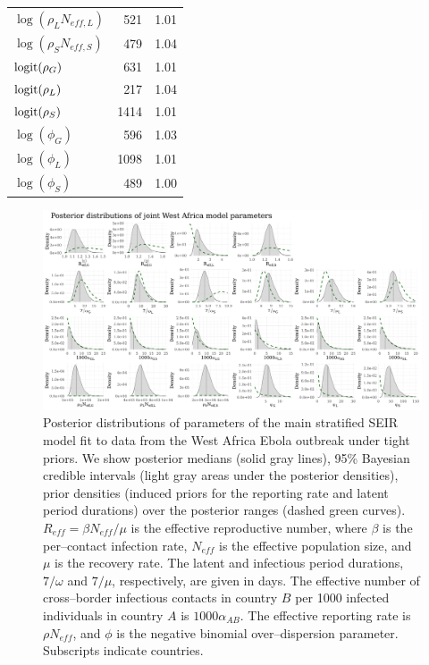 \begin{table}[htbp]
\begin{tabular}{lrr}
		$ \log(\rho_LN_{eff,L}) $& 521 & 1.01 \\ 
		$ \log(\rho_SN_{eff,S}) $& 479 & 1.04 \\ 
		$ \mathrm{logit}(\rho_G) $& 631 & 1.01 \\ 
		$ \mathrm{logit}(\rho_L) $& 217 & 1.04 \\ 
		$ \mathrm{logit}(\rho_S) $& 1414 & 1.01 \\ 
		$ \log(\phi_G) $& 596 & 1.03 \\ 
		$ \log(\phi_L) $& 1098 & 1.01 \\ 
		$ \log(\phi_S) $& 489 & 1.00 \\ 
		\hline
	\end{tabular}
\end{table}

\begin{figure}
	\begin{fullpage}
		\centering
		\includegraphics[width=\linewidth]{figures/ebola_joint_posts}
		\caption[Posterior distributions of parameters of the main stratified SEIR model fit to data from the West Africa Ebola outbreak.]{Posterior distributions of parameters of the main stratified SEIR model fit to data from the West Africa Ebola outbreak under tight priors. We show posterior medians (solid gray lines), 95\% Bayesian credible intervals (light gray areas under the posterior densities), prior densities (induced priors for the reporting rate and latent period durations) over the posterior ranges (dashed green curves). $ R_{eff} = \beta N_{eff}/\mu $ is the effective reproductive number, where $ \beta $ is the per--contact infection rate, $ N_{eff} $ is the effective population size, and $ \mu $ is the recovery rate. The latent and infectious period durations, $ 7/\omega $ and $ 7/\mu $, respectively, are given in days. The effective number of cross--border infectious contacts in country $ B $ per 1000 infected individuals in country $ A $ is $ 1000\alpha_{AB} $. The effective reporting rate is $ \rho N_{eff} $, and $ \phi $ is the negative binomial over--dispersion parameter. Subscripts indicate countries.}
		\label{fig:ebola_joint_posts}
	\end{fullpage}
\end{figure}

